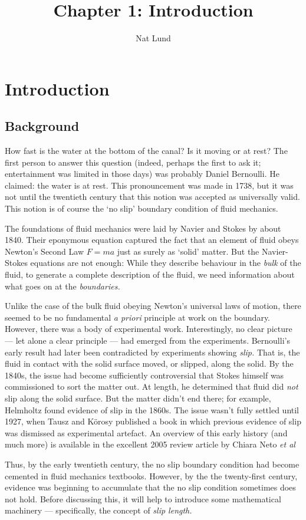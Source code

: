 \documentclass[12pt, a4paper, twoside, openright]{book}
\author{Nat Lund}
\title{Chapter 1: Introduction}
\begin{document}
\chapter{Introduction}

\section{Background}

How fast is the water at the bottom of the canal? Is it moving or at rest? The first person to answer this question (indeed, perhaps the first to ask it; entertainment was limited in those days) was probably Daniel Bernoulli. He claimed: the water is at rest. This pronouncement was made in 1738, but it was not until the twentieth century that this notion was accepted as universally valid. This notion is of course the `no slip' boundary condition of fluid mechanics.

The foundations of fluid mechanics were laid by Navier and Stokes by about 1840. Their eponymous equation captured the fact that an element of fluid obeys Newton's Second Law $F=ma$ just as surely as `solid' matter. But the Navier-Stokes equations are not enough: While they describe behaviour in the \emph{bulk} of the fluid, to generate a complete description of the fluid, we need information about what goes on at the \emph{boundaries.}

Unlike the case of the bulk fluid obeying Newton's universal laws of motion, there seemed to be no fundamental \emph{a priori} principle at work on the boundary. However, there was a body of experimental work. Interestingly, no clear picture --- let alone a clear principle --- had emerged from the experiments.  Bernoulli's early result had later been contradicted by experiments showing \emph{slip.} That is, the fluid in contact with the solid surface moved, or slipped, along the solid. By the 1840s, the issue had become sufficiently controversial that Stokes himself was commissioned to sort the matter out. At length, he determined that fluid did \emph{not} slip along the solid surface. But the matter didn't end there; for example, Helmholtz found evidence of slip in the 1860s. The issue wasn't fully settled until 1927, when Tausz and K\"orosy published a book in which previous evidence of slip was dismissed as experimental artefact. An overview of this early history (and much more) is available in the excellent 2005 review article by Chiara Neto \emph{et al} \cite{NetoReview2005} 

Thus, by the early twentieth century, the no slip boundary condition had become cemented in fluid mechanics textbooks. However, by the the twenty-first century, evidence was beginning to accumulate that the no slip condition sometimes does not hold.
Before discussing this, it will help to introduce some mathematical machinery --- specifically, the concept of \emph{slip length.}
\end{document}
